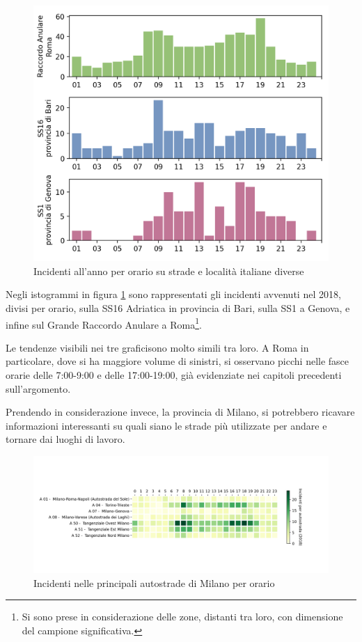 \documentclass[a4paper,12pt]{report}
\begin{document}
\begin{figure}
    \includegraphics[width=\linewidth]{../src/incidenti/incidenti_aci/orari/orari.png}
    \caption{Incidenti all'anno per orario su strade e località italiane diverse}
    \label{fig:orari-strade-aci}
\end{figure}

Negli istogrammi in figura \ref{fig:orari-strade-aci} sono rappresentati 
gli incidenti avvenuti 
nel 2018, divisi per orario, sulla SS16 Adriatica in provincia di Bari, sulla SS1 
a Genova, e infine sul Grande Raccordo Anulare a 
Roma\footnote{Si sono prese in considerazione delle zone, distanti tra loro, 
con dimensione del campione significativa.}. 

Le tendenze visibili nei tre graficisono molto simili tra loro. 
A Roma in particolare, dove si ha maggiore 
volume di sinistri, si osservano picchi nelle fasce orarie delle 
7:00-9:00 e delle 17:00-19:00, già evidenziate nei capitoli precedenti sull'argomento. 

Prendendo in considerazione invece, la provincia di Milano, si potrebbero ricavare 
informazioni interessanti su quali siano le strade più utilizzate per 
andare e tornare dai luoghi di lavoro. 

\begin{figure}
    \includegraphics[width=\linewidth]{../src/incidenti/incidenti_aci/orari/tangenziali_autostrade.png}
    \caption{Incidenti nelle principali autostrade di Milano per orario}
    \label{fig:tangenziali-autostrade}
\end{figure}
\end{document}
